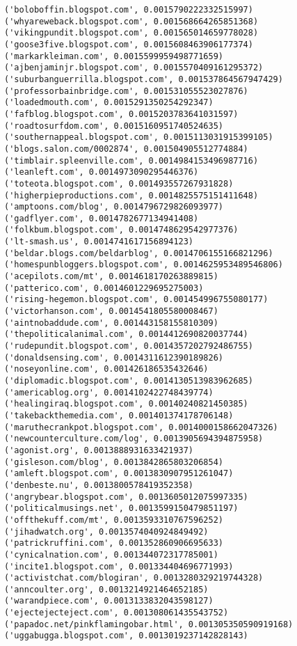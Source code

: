 \documentclass[11pt]{article}
\begin{document}
\begin{Verbatim}[commandchars=\\\{\}]
('boloboffin.blogspot.com', 0.0015790222332515997)
('whyareweback.blogspot.com', 0.001568664265851368)
('vikingpundit.blogspot.com', 0.001565014659778028)
('goose3five.blogspot.com', 0.0015608463906177374)
('markarkleiman.com', 0.0015599959498771659)
('ajbenjaminjr.blogspot.com', 0.0015570409161295372)
('suburbanguerrilla.blogspot.com', 0.001537864567947429)
('professorbainbridge.com', 0.001531055523027876)
('loadedmouth.com', 0.0015291350254292347)
('fafblog.blogspot.com', 0.0015203783641031597)
('roadtosurfdom.com', 0.0015160951740524635)
('southernappeal.blogspot.com', 0.0015113031915399105)
('blogs.salon.com/0002874', 0.001504905512774884)
('timblair.spleenville.com', 0.0014984153496987716)
('leanleft.com', 0.0014973090295446376)
('toteota.blogspot.com', 0.001493557267931828)
('higherpieproductions.com', 0.0014825575151411648)
('amptoons.com/blog', 0.0014796729826093977)
('gadflyer.com', 0.0014782677134941408)
('folkbum.blogspot.com', 0.0014748629542977376)
('lt-smash.us', 0.0014741617156894123)
('beldar.blogs.com/beldarblog', 0.0014706155166821296)
('homespunbloggers.blogspot.com', 0.0014625953489546806)
('acepilots.com/mt', 0.0014618170263889815)
('patterico.com', 0.0014601229695275003)
('rising-hegemon.blogspot.com', 0.001454996755080177)
('victorhanson.com', 0.0014541805580008467)
('aintnobaddude.com', 0.001443158155810309)
('thepoliticalanimal.com', 0.0014412690820037744)
('rudepundit.blogspot.com', 0.0014357202792486755)
('donaldsensing.com', 0.0014311612390189826)
('noseyonline.com', 0.001426186535432646)
('diplomadic.blogspot.com', 0.0014130513983962685)
('americablog.org', 0.0014102422748439774)
('healingiraq.blogspot.com', 0.00140240821450385)
('takebackthemedia.com', 0.001401374178706148)
('maruthecrankpot.blogspot.com', 0.0014000158662047326)
('newcounterculture.com/log', 0.0013905694394875958)
('agonist.org', 0.0013888931633421937)
('gisleson.com/blog', 0.0013842865803206854)
('amleft.blogspot.com', 0.0013830907951261047)
('denbeste.nu', 0.0013800578419352358)
('angrybear.blogspot.com', 0.0013605012075997335)
('politicalmusings.net', 0.0013599150479851197)
('offthekuff.com/mt', 0.0013593310767596252)
('jihadwatch.org', 0.0013574040924849492)
('patrickruffini.com', 0.001352860906695633)
('cynicalnation.com', 0.001344072317785001)
('incite1.blogspot.com', 0.001334404696771993)
('activistchat.com/blogiran', 0.0013280329219744328)
('anncoulter.org', 0.0013214921464652185)
('warandpiece.com', 0.0013133832043598127)
('ejectejecteject.com', 0.001308061435543752)
('papadoc.net/pinkflamingobar.html', 0.001305350590919168)
('uggabugga.blogspot.com', 0.0013019237142828143)

\end{Verbatim}
\end{document}
